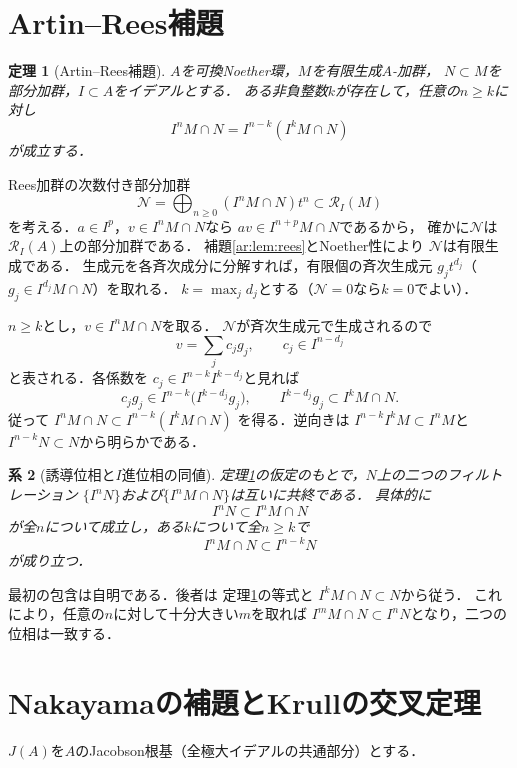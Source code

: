 \documentclass[a5paper,10pt,onecolumn]{jsarticle}
\makeatletter
\theoremstyle{mathnotetheorem}
\newtheorem{theorem}{定理}[section]
\newtheorem{corollary}[theorem]{系}
\renewcommand{\proofname}{証明}
\renewenvironment{proof}[1][\proofname]{%
  \par\pushQED{\qed}\normalfont\topsep4\p@\@plus2\p@\relax
  \trivlist\item[\hskip\labelsep\bfseries #1]\ignorespaces
}{\popQED\endtrivlist\@endpefalse}
\makeatother
\begin{document}
\section{Artin--Rees補題}
\begin{theorem}[Artin--Rees補題]\label{ar:thm:AR}
$A$を可換Noether環，$M$を有限生成$A$-加群，
$N\subset M$を部分加群，$I\subset A$をイデアルとする．
ある非負整数$k$が存在して，任意の$n\ge k$に対し
\[
 I^nM\cap N=I^{n-k}(I^kM\cap N)
\]
が成立する．
\end{theorem}
\begin{proof}
Rees加群の次数付き部分加群
\[
 \mathcal N=\bigoplus_{n\ge0}(I^nM\cap N)t^n
 \subset\mathcal R_I(M)
\]
を考える．$a\in I^p$，$v\in I^nM\cap N$なら
$av\in I^{n+p}M\cap N$であるから，
確かに$\mathcal N$は$\mathcal R_I(A)$上の部分加群である．
補題\ref{ar:lem:rees}とNoether性により
$\mathcal N$は有限生成である．
生成元を各斉次成分に分解すれば，有限個の斉次生成元
$g_jt^{d_j}$（$g_j\in I^{d_j}M\cap N$）を取れる．
$k=\max_jd_j$とする（$\mathcal N=0$なら$k=0$でよい）．

$n\ge k$とし，$v\in I^nM\cap N$を取る．
$\mathcal N$が斉次生成元で生成されるので
\[
 v=\sum_j c_jg_j,\qquad c_j\in I^{n-d_j}
\]
と表される．各係数を
$c_j\in I^{n-k}I^{k-d_j}$と見れば
\[
 c_jg_j\in I^{n-k}\bigl(I^{k-d_j}g_j\bigr),\qquad
 I^{k-d_j}g_j\subset I^kM\cap N.
\]
従って
$ I^nM\cap N\subset I^{n-k}(I^kM\cap N)$
を得る．逆向きは
$ I^{n-k}I^kM\subset I^nM$と
$ I^{n-k}N\subset N$から明らかである．
\end{proof}

\begin{corollary}[誘導位相と$I$進位相の同値]\label{ar:cor:topology}
定理\ref{ar:thm:AR}の仮定のもとで，$N$上の二つのフィルトレーション
$\{I^nN\}$および$\{I^nM\cap N\}$は互いに共終である．
具体的に
\[
 I^nN\subset I^nM\cap N
\]
が全$n$について成立し，ある$k$について全$n\ge k$で
\[
 I^nM\cap N\subset I^{n-k}N
\]
が成り立つ．
\end{corollary}
\begin{proof}
最初の包含は自明である．後者は
定理\ref{ar:thm:AR}の等式と
$I^kM\cap N\subset N$から従う．
これにより，任意の$n$に対して十分大きい$m$を取れば
$I^mM\cap N\subset I^nN$となり，二つの位相は一致する．
\end{proof}

\section{Nakayamaの補題とKrullの交叉定理}
$J(A)$を$A$のJacobson根基（全極大イデアルの共通部分）とする．
\end{document}
